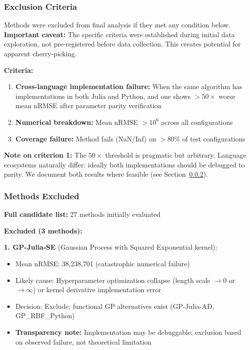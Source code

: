 \subsubsection{Exclusion Criteria}

Methods were excluded from final analysis if they met any condition below. \textbf{Important caveat:} The specific criteria were established during initial data exploration, not pre-registered before data collection. This creates potential for apparent cherry-picking.

\textbf{Criteria:}

\begin{enumerate}
    \item \textbf{Cross-language implementation failure:} When the same algorithm has implementations in both Julia and Python, and one shows $>50\times$ worse mean nRMSE after parameter parity verification
    \item \textbf{Numerical breakdown:} Mean nRMSE $> 10^6$ across all configurations
    \item \textbf{Coverage failure:} Method fails (NaN/Inf) on $>80\%$ of test configurations
\end{enumerate}

\textbf{Note on criterion 1:} The $50\times$ threshold is pragmatic but arbitrary. Language ecosystems naturally differ; ideally both implementations should be debugged to parity. We document both results where feasible (see Section~\ref{sec:exclusions}).

\subsubsection{Methods Excluded}
\label{sec:exclusions}

\textbf{Full candidate list:} 27 methods initially evaluated

\textbf{Excluded (3 methods):}

\textbf{1. GP-Julia-SE} (Gaussian Process with Squared Exponential kernel):
\begin{itemize}
    \item Mean nRMSE: 38,238,701 (catastrophic numerical failure)
    \item Likely cause: Hyperparameter optimization collapse (length scale $\rightarrow 0$ or $\rightarrow \infty$) or kernel derivative implementation error
    \item Decision: Exclude; functional GP alternatives exist (GP-Julia-AD, GP\_RBF\_Python)
    \item \textbf{Transparency note:} Implementation may be debuggable; exclusion based on observed failure, not theoretical limitation
\end{itemize}

